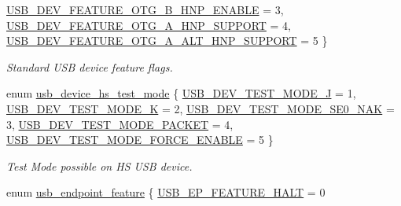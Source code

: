 \begin{DoxyCompactItemize}
\hyperlink{group__usb__protocol__group_ggab9975b89ad7079085d0300eab037c3aca57260a8f513dcdd3bd2285d53d09eee6}{\-U\-S\-B\-\_\-\-D\-E\-V\-\_\-\-F\-E\-A\-T\-U\-R\-E\-\_\-\-O\-T\-G\-\_\-\-B\-\_\-\-H\-N\-P\-\_\-\-E\-N\-A\-B\-L\-E} =  3, 
\hyperlink{group__usb__protocol__group_ggab9975b89ad7079085d0300eab037c3acaa1a5410f25b09a7351d8701574770e5a}{\-U\-S\-B\-\_\-\-D\-E\-V\-\_\-\-F\-E\-A\-T\-U\-R\-E\-\_\-\-O\-T\-G\-\_\-\-A\-\_\-\-H\-N\-P\-\_\-\-S\-U\-P\-P\-O\-R\-T} =  4, 
\*
\hyperlink{group__usb__protocol__group_ggab9975b89ad7079085d0300eab037c3acac16fde59a39765321c5649b7f23145cb}{\-U\-S\-B\-\_\-\-D\-E\-V\-\_\-\-F\-E\-A\-T\-U\-R\-E\-\_\-\-O\-T\-G\-\_\-\-A\-\_\-\-A\-L\-T\-\_\-\-H\-N\-P\-\_\-\-S\-U\-P\-P\-O\-R\-T} =  5
 \}
\begin{DoxyCompactList}\small\item\em \-Standard \-U\-S\-B device feature flags. \end{DoxyCompactList}\item 
enum \hyperlink{group__usb__protocol__group_ga9027bb283d3666e351fe5c403292cf2e}{usb\-\_\-device\-\_\-hs\-\_\-test\-\_\-mode} \{ \*
\hyperlink{group__usb__protocol__group_gga9027bb283d3666e351fe5c403292cf2ea713e4c1b7782e135f6e269d98fdd8ce5}{\-U\-S\-B\-\_\-\-D\-E\-V\-\_\-\-T\-E\-S\-T\-\_\-\-M\-O\-D\-E\-\_\-\-J} =  1, 
\hyperlink{group__usb__protocol__group_gga9027bb283d3666e351fe5c403292cf2ea7ca60c446646b513db46c8d70f95246d}{\-U\-S\-B\-\_\-\-D\-E\-V\-\_\-\-T\-E\-S\-T\-\_\-\-M\-O\-D\-E\-\_\-\-K} =  2, 
\hyperlink{group__usb__protocol__group_gga9027bb283d3666e351fe5c403292cf2eacf3a0aaed1aab82bfee139fd1b3f8126}{\-U\-S\-B\-\_\-\-D\-E\-V\-\_\-\-T\-E\-S\-T\-\_\-\-M\-O\-D\-E\-\_\-\-S\-E0\-\_\-\-N\-A\-K} =  3, 
\hyperlink{group__usb__protocol__group_gga9027bb283d3666e351fe5c403292cf2eaae5d97af6d3f98cd6e4fc15d9a5eb5e9}{\-U\-S\-B\-\_\-\-D\-E\-V\-\_\-\-T\-E\-S\-T\-\_\-\-M\-O\-D\-E\-\_\-\-P\-A\-C\-K\-E\-T} =  4, 
\*
\hyperlink{group__usb__protocol__group_gga9027bb283d3666e351fe5c403292cf2ea018bc9685230b902d4432c5705161df3}{\-U\-S\-B\-\_\-\-D\-E\-V\-\_\-\-T\-E\-S\-T\-\_\-\-M\-O\-D\-E\-\_\-\-F\-O\-R\-C\-E\-\_\-\-E\-N\-A\-B\-L\-E} =  5
 \}
\begin{DoxyCompactList}\small\item\em \-Test \-Mode possible on \-H\-S \-U\-S\-B device. \end{DoxyCompactList}\item 
enum \hyperlink{group__usb__protocol__group_gac46bc23132eb03cefa56ba47024ced5d}{usb\-\_\-endpoint\-\_\-feature} \{ \hyperlink{group__usb__protocol__group_ggac46bc23132eb03cefa56ba47024ced5daa346bf01bfcb9964e754b44c9b999d16}{\-U\-S\-B\-\_\-\-E\-P\-\_\-\-F\-E\-A\-T\-U\-R\-E\-\_\-\-H\-A\-L\-T} =  0

\end{DoxyCompactItemize}
